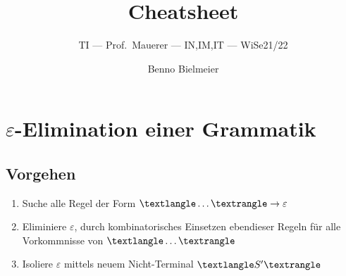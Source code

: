 \documentclass[a4paper,parskip=half,footsepline,headings=normal,titlepage=false]{scrartcl}
\title{Cheatsheet}
\subtitle{\acl{TI} --- Prof.~Mauerer --- IN,IM,IT --- \acs{WiSe}21/22}
\author{Benno Bielmeier}
\newcommand{\nt}[1]{\textlangle\uppercase{#1}\textrangle}
\renewcommand{\epsilon}{\varepsilon}
\begin{document}

\begin{acronym}
\end{acronym}

\maketitle
\tableofcontents

\section{\texorpdfstring{$\epsilon$}{Epsilon}-Elimination einer Grammatik}
\subsection*{Vorgehen}
\begin{enumerate}[label=\alph*)]
	\item Suche alle Regel der Form {\color{c1}$\nt{\dots} \to \epsilon$}
	\item {\color{c2}Eliminiere $\epsilon$}, durch kombinatorisches Einsetzen ebendieser Regeln für alle Vorkommnisse von \textcolor{c1}{$\nt{\dots}$}
	\item {\color{c3}Isoliere $\epsilon$} mittels neuem Nicht-Terminal \textcolor{c3}{$\nt{S'}$}
\end{enumerate}
\end{document}
